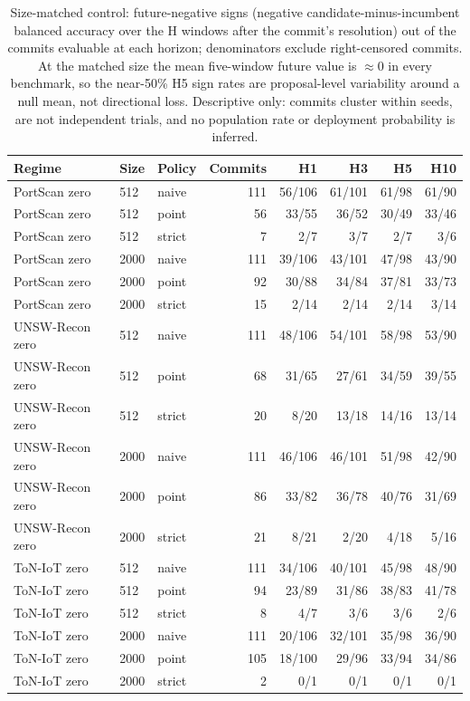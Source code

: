\begin{table}
\centering
\caption{Size-matched control: future-negative signs (negative candidate-minus-incumbent
balanced accuracy over the H windows after the commit's resolution) out of the commits
evaluable at each horizon; denominators exclude right-censored commits. At the matched size
the mean five-window future value is $\approx 0$ in every benchmark, so the near-50\%
H5 sign rates are proposal-level variability around a null mean, not directional loss.
Descriptive only: commits cluster within seeds, are not independent trials, and no
population rate or deployment probability is inferred.}
\label{tab:size_matched_supp_harm}
\scriptsize
\begin{tabular}{l l l r r r r r}
\toprule
Regime & Size & Policy & Commits & H1 & H3 & H5 & H10 \\
\midrule
PortScan zero & 512 & naive & 111 & 56/106 & 61/101 & 61/98 & 61/90 \\
PortScan zero & 512 & point & 56 & 33/55 & 36/52 & 30/49 & 33/46 \\
PortScan zero & 512 & strict & 7 & 2/7 & 3/7 & 2/7 & 3/6 \\
PortScan zero & 2000 & naive & 111 & 39/106 & 43/101 & 47/98 & 43/90 \\
PortScan zero & 2000 & point & 92 & 30/88 & 34/84 & 37/81 & 33/73 \\
PortScan zero & 2000 & strict & 15 & 2/14 & 2/14 & 2/14 & 3/14 \\
\addlinespace
UNSW-Recon zero & 512 & naive & 111 & 48/106 & 54/101 & 58/98 & 53/90 \\
UNSW-Recon zero & 512 & point & 68 & 31/65 & 27/61 & 34/59 & 39/55 \\
UNSW-Recon zero & 512 & strict & 20 & 8/20 & 13/18 & 14/16 & 13/14 \\
UNSW-Recon zero & 2000 & naive & 111 & 46/106 & 46/101 & 51/98 & 42/90 \\
UNSW-Recon zero & 2000 & point & 86 & 33/82 & 36/78 & 40/76 & 31/69 \\
UNSW-Recon zero & 2000 & strict & 21 & 8/21 & 2/20 & 4/18 & 5/16 \\
\addlinespace
ToN-IoT zero & 512 & naive & 111 & 34/106 & 40/101 & 45/98 & 48/90 \\
ToN-IoT zero & 512 & point & 94 & 23/89 & 31/86 & 38/83 & 41/78 \\
ToN-IoT zero & 512 & strict & 8 & 4/7 & 3/6 & 3/6 & 2/6 \\
ToN-IoT zero & 2000 & naive & 111 & 20/106 & 32/101 & 35/98 & 36/90 \\
ToN-IoT zero & 2000 & point & 105 & 18/100 & 29/96 & 33/94 & 34/86 \\
ToN-IoT zero & 2000 & strict & 2 & 0/1 & 0/1 & 0/1 & 0/1 \\
\bottomrule
\end{tabular}
\end{table}
